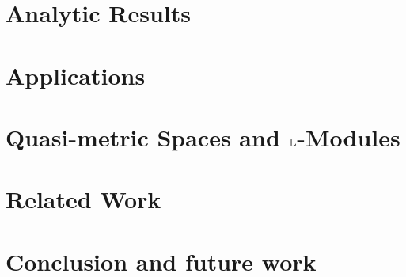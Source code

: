 \documentclass[conference]{IEEEtran}
\begin{document}
\section{Analytic Results}
%


\section{Applications}
%


\section{Quasi-metric Spaces and $\mathbb{L}$-Modules}\label{sec:QMod}
%


\section{Related Work}



\section{Conclusion and future work}

\end{document}
